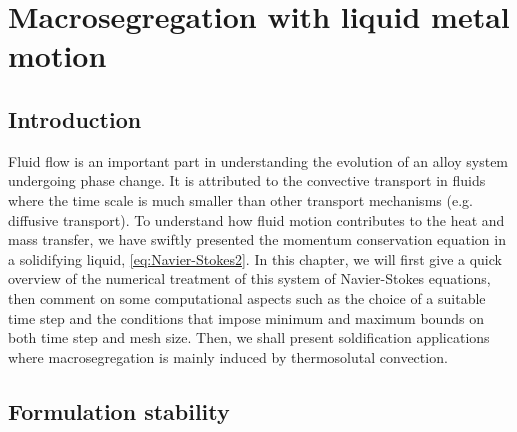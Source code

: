 \chapter{Macrosegregation with liquid metal motion}
\begin{nolinkcolors} 
\minitoc
\end{nolinkcolors}
\newpage

\section{Introduction}

Fluid flow is an important part in understanding the evolution of an alloy system
undergoing phase change. It is attributed to the convective transport in fluids
where the time scale is much smaller than other transport mechanisms (e.g. diffusive transport). 
To understand how fluid motion contributes to the heat and mass transfer, we have 
swiftly presented the momentum conservation equation in a solidifying liquid, \cref{eq:Navier-Stokes2}.
In this chapter, we will first give a quick overview of the numerical treatment of this system of 
Navier-Stokes equations, then comment on some computational aspects such as the choice of a suitable time step and
the conditions that impose minimum and maximum bounds on both time step and mesh size. 
Then, we shall present soldification applications
where macrosegregation is mainly induced by thermosolutal convection.

\section{Formulation stability}

